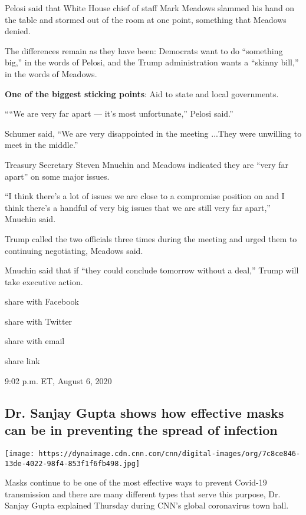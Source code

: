 Pelosi said that White House chief of staff Mark Meadows slammed his
hand on the table and stormed out of the room at one point, something
that Meadows denied.

The differences remain as they have been: Democrats want to do
``something big,'' in the words of Pelosi, and the Trump administration
wants a ``skinny bill,'' in the words of Meadows.

\textbf{One of the biggest sticking points}: Aid to state and local
governments.

````We are very far apart --- it's most unfortunate,'' Pelosi said.''

Schumer said, ``We are very disappointed in the meeting ...They were
unwilling to meet in the middle.''

Treasury Secretary Steven Mnuchin and Meadows indicated they are ``very
far apart'' on some major issues.

``I think there's a lot of issues we are close to a compromise position
on and I think there's a handful of very big issues that we are still
very far apart,'' Mnuchin said.

Trump called the two officials three times during the meeting and urged
them to continuing negotiating, Meadows said.

Mnuchin said that if ``they could conclude tomorrow without a deal,''
Trump will take executive action.

share with Facebook

share with Twitter

share with email

share link

9:02 p.m. ET, August 6, 2020

\hypertarget{dr-sanjay-gupta-shows-how-effective-masks-can-be-in-preventing-the-spread-of-infection}{%
\subsection{Dr. Sanjay Gupta shows how effective masks can be in
preventing the spread of
infection}\label{dr-sanjay-gupta-shows-how-effective-masks-can-be-in-preventing-the-spread-of-infection}}

\texttt{[image: https://dynaimage.cdn.cnn.com/cnn/digital-images/org/7c8ce846-13de-4022-98f4-853f1f6fb498.jpg]}

Masks continue to be one of the most effective ways to prevent Covid-19
transmission and there are many different types that serve this purpose,
Dr. Sanjay Gupta explained Thursday during CNN's global coronavirus town
hall.

